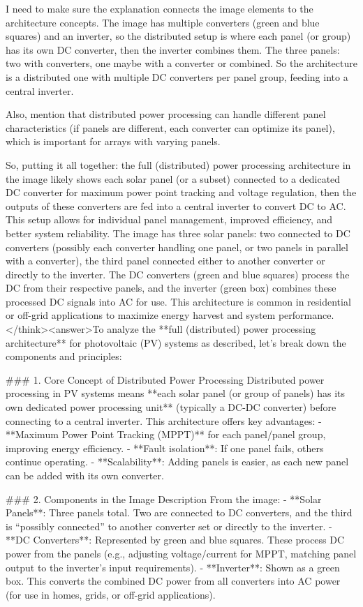 I need to make sure the explanation connects the image elements to the architecture concepts. The image has multiple converters (green and blue squares) and an inverter, so the distributed setup is where each panel (or group) has its own DC converter, then the inverter combines them. The three panels: two with converters, one maybe with a converter or combined. So the architecture is a distributed one with multiple DC converters per panel group, feeding into a central inverter. 

Also, mention that distributed power processing can handle different panel characteristics (if panels are different, each converter can optimize its panel), which is important for arrays with varying panels. 

So, putting it all together: the full (distributed) power processing architecture in the image likely shows each solar panel (or a subset) connected to a dedicated DC converter for maximum power point tracking and voltage regulation, then the outputs of these converters are fed into a central inverter to convert DC to AC. This setup allows for individual panel management, improved efficiency, and better system reliability. The image has three solar panels: two connected to DC converters (possibly each converter handling one panel, or two panels in parallel with a converter), the third panel connected either to another converter or directly to the inverter. The DC converters (green and blue squares) process the DC from their respective panels, and the inverter (green box) combines these processed DC signals into AC for use. This architecture is common in residential or off-grid applications to maximize energy harvest and system performance.</think><answer>To analyze the **full (distributed) power processing architecture** for photovoltaic (PV) systems as described, let’s break down the components and principles:  


### 1. Core Concept of Distributed Power Processing  
Distributed power processing in PV systems means **each solar panel (or group of panels) has its own dedicated power processing unit** (typically a DC-DC converter) before connecting to a central inverter. This architecture offers key advantages:  
- **Maximum Power Point Tracking (MPPT)** for each panel/panel group, improving energy efficiency.  
- **Fault isolation**: If one panel fails, others continue operating.  
- **Scalability**: Adding panels is easier, as each new panel can be added with its own converter.  


### 2. Components in the Image Description  
From the image:  
- **Solar Panels**: Three panels total. Two are connected to DC converters, and the third is “possibly connected” to another converter set or directly to the inverter.  
- **DC Converters**: Represented by green and blue squares. These process DC power from the panels (e.g., adjusting voltage/current for MPPT, matching panel output to the inverter’s input requirements).  
- **Inverter**: Shown as a green box. This converts the combined DC power from all converters into AC power (for use in homes, grids, or off-grid applications).  


